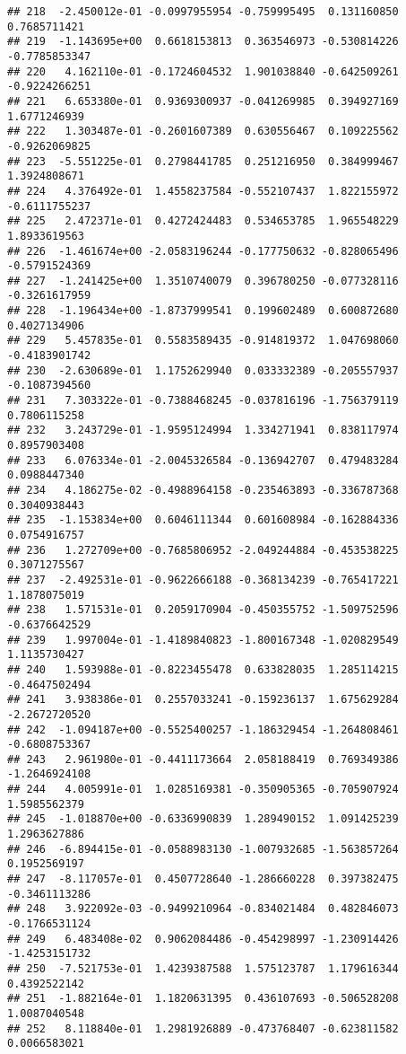 \documentclass[
]{article}
\begin{document}
\begin{verbatim}
## 218  -2.450012e-01 -0.0997955954 -0.759995495  0.131160850  0.7685711421
## 219  -1.143695e+00  0.6618153813  0.363546973 -0.530814226 -0.7785853347
## 220   4.162110e-01 -0.1724604532  1.901038840 -0.642509261 -0.9224266251
## 221   6.653380e-01  0.9369300937 -0.041269985  0.394927169  1.6771246939
## 222   1.303487e-01 -0.2601607389  0.630556467  0.109225562 -0.9262069825
## 223  -5.551225e-01  0.2798441785  0.251216950  0.384999467  1.3924808671
## 224   4.376492e-01  1.4558237584 -0.552107437  1.822155972 -0.6111755237
## 225   2.472371e-01  0.4272424483  0.534653785  1.965548229  1.8933619563
## 226  -1.461674e+00 -2.0583196244 -0.177750632 -0.828065496 -0.5791524369
## 227  -1.241425e+00  1.3510740079  0.396780250 -0.077328116 -0.3261617959
## 228  -1.196434e+00 -1.8737999541  0.199602489  0.600872680  0.4027134906
## 229   5.457835e-01  0.5583589435 -0.914819372  1.047698060 -0.4183901742
## 230  -2.630689e-01  1.1752629940  0.033332389 -0.205557937 -0.1087394560
## 231   7.303322e-01 -0.7388468245 -0.037816196 -1.756379119  0.7806115258
## 232   3.243729e-01 -1.9595124994  1.334271941  0.838117974  0.8957903408
## 233   6.076334e-01 -2.0045326584 -0.136942707  0.479483284  0.0988447340
## 234   4.186275e-02 -0.4988964158 -0.235463893 -0.336787368  0.3040938443
## 235  -1.153834e+00  0.6046111344  0.601608984 -0.162884336  0.0754916757
## 236   1.272709e+00 -0.7685806952 -2.049244884 -0.453538225  0.3071275567
## 237  -2.492531e-01 -0.9622666188 -0.368134239 -0.765417221  1.1878075019
## 238   1.571531e-01  0.2059170904 -0.450355752 -1.509752596 -0.6376642529
## 239   1.997004e-01 -1.4189840823 -1.800167348 -1.020829549  1.1135730427
## 240   1.593988e-01 -0.8223455478  0.633828035  1.285114215 -0.4647502494
## 241   3.938386e-01  0.2557033241 -0.159236137  1.675629284 -2.2672720520
## 242  -1.094187e+00 -0.5525400257 -1.186329454 -1.264808461 -0.6808753367
## 243   2.961980e-01 -0.4411173664  2.058188419  0.769349386 -1.2646924108
## 244   4.005991e-01  1.0285169381 -0.350905365 -0.705907924  1.5985562379
## 245  -1.018870e+00 -0.6336990839  1.289490152  1.091425239  1.2963627886
## 246  -6.894415e-01 -0.0588983130 -1.007932685 -1.563857264  0.1952569197
## 247  -8.117057e-01  0.4507728640 -1.286660228  0.397382475 -0.3461113286
## 248   3.922092e-03 -0.9499210964 -0.834021484  0.482846073 -0.1766531124
## 249   6.483408e-02  0.9062084486 -0.454298997 -1.230914426 -1.4253151732
## 250  -7.521753e-01  1.4239387588  1.575123787  1.179616344  0.4392522142
## 251  -1.882164e-01  1.1820631395  0.436107693 -0.506528208  1.0087040548
## 252   8.118840e-01  1.2981926889 -0.473768407 -0.623811582  0.0066583021

\end{verbatim}
\end{document}
